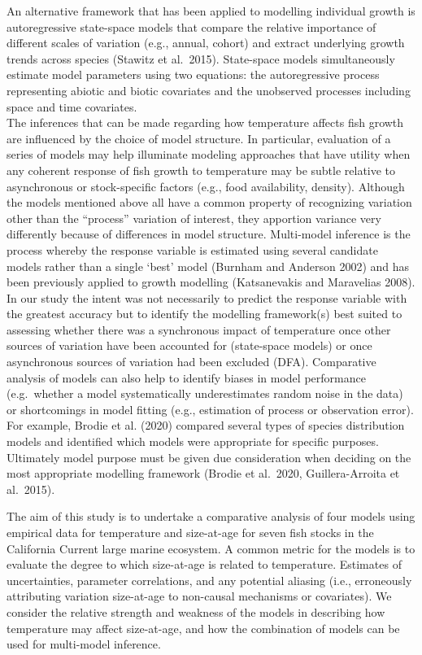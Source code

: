 \documentclass[]{article}
\begin{document}
An alternative framework that has been applied to modelling individual
growth is autoregressive state-space models that compare the relative
importance of different scales of variation (e.g., annual, cohort) and
extract underlying growth trends across species (Stawitz et al.~2015).
State-space models simultaneously estimate model parameters using two
equations: the autoregressive process representing abiotic and biotic
covariates and the unobserved processes including space and time
covariates.\\
The inferences that can be made regarding how temperature affects fish
growth are influenced by the choice of model structure. In particular,
evaluation of a series of models may help illuminate modeling approaches
that have utility when any coherent response of fish growth to
temperature may be subtle relative to asynchronous or stock-specific
factors (e.g., food availability, density). Although the models
mentioned above all have a common property of recognizing variation
other than the ``process'' variation of interest, they apportion
variance very differently because of differences in model structure.
Multi-model inference is the process whereby the response variable is
estimated using several candidate models rather than a single `best'
model (Burnham and Anderson 2002) and has been previously applied to
growth modelling (Katsanevakis and Maravelias 2008). In our study the
intent was not necessarily to predict the response variable with the
greatest accuracy but to identify the modelling framework(s) best suited
to assessing whether there was a synchronous impact of temperature once
other sources of variation have been accounted for (state-space models)
or once asynchronous sources of variation had been excluded (DFA).
Comparative analysis of models can also help to identify biases in model
performance (e.g.~whether a model systematically underestimates random
noise in the data) or shortcomings in model fitting (e.g., estimation of
process or observation error). For example, Brodie et al. (2020)
compared several types of species distribution models and identified
which models were appropriate for specific purposes. Ultimately model
purpose must be given due consideration when deciding on the most
appropriate modelling framework (Brodie et al.~2020, Guillera-Arroita et
al.~2015).

The aim of this study is to undertake a comparative analysis of four
models using empirical data for temperature and size-at-age for seven
fish stocks in the California Current large marine ecosystem. A common
metric for the models is to evaluate the degree to which size-at-age is
related to temperature. Estimates of uncertainties, parameter
correlations, and any potential aliasing (i.e., erroneously attributing
variation size-at-age to non-causal mechanisms or covariates). We
consider the relative strength and weakness of the models in describing
how temperature may affect size-at-age, and how the combination of
models can be used for multi-model inference.
\end{document}
